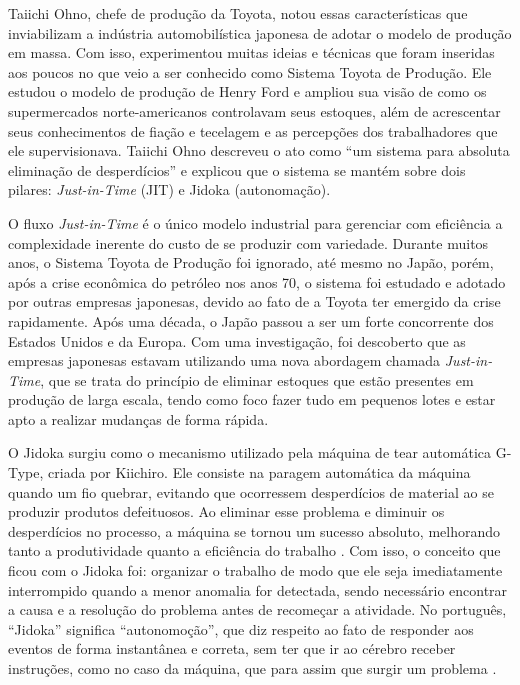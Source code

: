 Taiichi Ohno, chefe de produção da Toyota, notou essas características que inviabilizam a indústria automobilística japonesa de adotar o modelo de produção em massa. Com isso, experimentou muitas ideias e técnicas que foram inseridas aos poucos no que veio a ser conhecido como Sistema Toyota de Produção. Ele estudou o modelo de produção de Henry Ford e ampliou sua visão de como os supermercados norte-americanos controlavam seus estoques, além de acrescentar seus conhecimentos de fiação e tecelagem e as percepções dos trabalhadores que ele supervisionava. Taiichi Ohno descreveu o ato como “um sistema para absoluta eliminação de desperdícios” e explicou que o sistema se mantém sobre dois pilares: \textit{Just-in-Time} (JIT) e Jidoka (autonomação). 

O fluxo \textit{Just-in-Time} é o único modelo industrial para gerenciar com eficiência a complexidade inerente do custo de se produzir com variedade. Durante muitos anos, o Sistema Toyota de Produção foi ignorado, até mesmo no Japão, porém, após a crise econômica do petróleo nos anos 70, o sistema foi estudado e adotado por outras empresas japonesas, devido ao fato de a Toyota ter emergido da crise rapidamente. Após uma década, o Japão passou a ser um forte concorrente dos Estados Unidos e da Europa. Com uma investigação, foi descoberto que as empresas japonesas estavam utilizando uma nova abordagem chamada \textit{Just-in-Time}, que se trata do princípio de eliminar estoques que estão presentes em produção de larga escala, tendo como foco fazer tudo em pequenos lotes e estar apto a realizar mudanças de forma rápida. 

O Jidoka surgiu como o mecanismo utilizado pela máquina de tear automática G-Type, criada por Kiichiro. Ele consiste na paragem automática da máquina quando um fio quebrar, evitando que ocorressem desperdícios de material ao se produzir produtos defeituosos. Ao eliminar esse problema e diminuir os desperdícios no processo, a máquina se tornou um sucesso absoluto, melhorando tanto a produtividade quanto a eficiência do trabalho \cite{katayama2010}. Com isso, o conceito que ficou com o Jidoka foi: organizar o trabalho de modo que ele seja imediatamente interrompido quando a menor anomalia for detectada, sendo necessário encontrar a causa e a resolução do problema antes de recomeçar a atividade. No português, “Jidoka” significa “autonomoção”, que diz respeito ao fato de responder aos eventos de forma instantânea e correta, sem ter que ir ao cérebro receber instruções, como no caso da máquina, que para assim que surgir um problema \cite{poppendieck}. 


